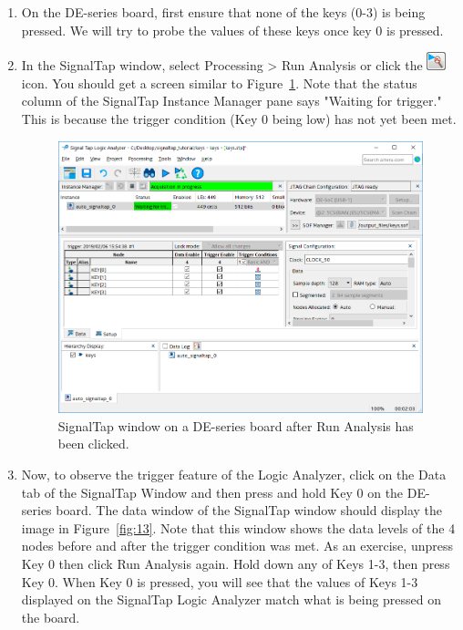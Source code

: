 \documentclass[11pt, twoside, pdftex]{article}
\begin{document}
\begin{enumerate}

\item On the DE-series board, first ensure that none of the keys (0-3) is being pressed. We will try to probe the values of these keys once key 0 is pressed.

\item In the SignalTap window, select {\sf Processing > Run Analysis} or click the \includegraphics[scale=0.7]{figures/icon1.png} icon. 
You should get a screen similar to Figure~\ref{fig:12}. Note that the status column of the SignalTap Instance Manager pane says "Waiting for
trigger." This is because the trigger condition (Key 0 being low) has not yet been met.
  
\begin{figure}[H]
   \begin{center}
      \includegraphics[scale=0.65]{figures/figure12.png}
   \caption{SignalTap window on a DE-series board after Run Analysis has been clicked.} 
	 \label{fig:12}
	 \end{center}
\end{figure}

\item Now, to observe the trigger feature of the Logic Analyzer, click
on the {\sf Data} tab of the SignalTap Window and then press and hold Key 0 on the DE-series board. The data window
of the SignalTap window should display the image in Figure~\ref{fig:13}. Note that this window shows the data levels
of the 4 nodes before and after the trigger condition was met. As an exercise, unpress Key 0 then click {\sf Run Analysis} again. Hold down any of Keys 1-3, then press Key 0. When Key 0 is pressed, you will see that the values of Keys 1-3
displayed on the SignalTap Logic Analyzer match what is being pressed on the board.
  
\end{enumerate}
\end{document}
